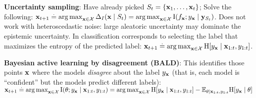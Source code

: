 \textbf{Uncertainty sampling}: Have already picked $S_t = \{\mathbf{x}_1, \dots, \mathbf{x}_t\}$; Solve the following: $\vx_{t+1} \defeq \argmax_{\vx \in \spX} \Delta_I(\vx \mid \sS_t) = \argmax_{\vx \in \spX} \Ism{f_\vx}{y_{\vx} \mid \vy_{\sS_t}}$. Does not work with heteroscedastic noise: large aleatoric uncertainty may dominate the epistemic uncertainty. In classification corresponds to selecting the label that maximizes the entropy of the predicted label: $\vx_{t+1} \defeq \argmax_{\vx \in \spX} \H{y_{\vx} \mid \vx_{1:t}, y_{1:t}}$. \\
\begin{framed}
    \textbf{Bayesian active learning by disagreement (BALD)}: This identifies those points $\mathbf{x}$ where the models \emph{disagree} about the label $y_{\mathbf{x}}$ (that is, each model is ``confident'' but the models predict different labels): $\vx_{t+1} \defeq \argmax_{\vx \in \spX} \I{\vtheta}{y_{\vx} \mid \vx_{1:t}, y_{1:t}} = \argmax_{\vx \in \spX} \H{y_{\vx} \mid \vx_{1:t}, y_{1:t}} - \E*[\vtheta \mid \vx_{1:t}, y_{1:t}]{\H{y_{\vx} \mid \vtheta}}$ 
\end{framed}
